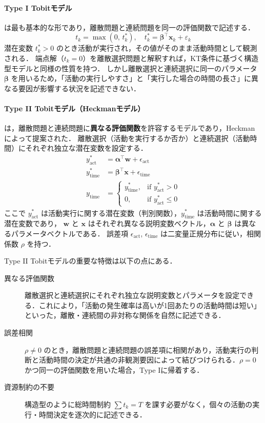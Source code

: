 \paragraph{Type I Tobitモデル}は最も基本的な形であり，離散問題と連続問題を同一の評価関数で記述する．
\begin{equation}\label{eq:tobit_typeI}
  t_k = \max(0, \, t_k^*), \quad t_k^* = \bm{\beta}^\top \bm{x}_k + \varepsilon_k
\end{equation}
潜在変数 $t_k^* > 0$ のとき活動が実行され，その値がそのまま活動時間として観測される．
端点解（$t_k = 0$）を離散選択問題と解釈すれば，KT条件に基づく構造型モデルと同様の性質を持つ．
しかし離散選択と連続選択に同一のパラメータ $\bm{\beta}$ を用いるため，「活動の実行しやすさ」と「実行した場合の時間の長さ」に異なる要因が影響する状況を記述できない．

\paragraph{Type II Tobitモデル（Heckmanモデル）}は，離散問題と連続問題に\textbf{異なる評価関数}を許容するモデルであり，Heckman \cite{Heckman1979} によって提案された．
離散選択（活動を実行するか否か）と連続選択（活動時間）にそれぞれ独立な潜在変数を設定する．
\begin{align}
  y^*_{\mathrm{act}} &= \bm{\alpha}^\top \bm{w} + \epsilon_{\mathrm{act}} \label{eq:tobit2_discrete} \\
  y^*_{\mathrm{time}} &= \bm{\beta}^\top \bm{x} + \epsilon_{\mathrm{time}} \label{eq:tobit2_continuous} \\
  y_{\mathrm{time}} &= \begin{cases} y^*_{\mathrm{time}}, & \text{if } y^*_{\mathrm{act}} > 0 \\ 0, & \text{if } y^*_{\mathrm{act}} \leq 0 \end{cases} \label{eq:tobit2_observe}
\end{align}
ここで $y^*_{\mathrm{act}}$ は活動実行に関する潜在変数（判別関数），$y^*_{\mathrm{time}}$ は活動時間に関する潜在変数であり，
$\bm{w}$ と $\bm{x}$ はそれぞれ異なる説明変数ベクトル，$\bm{\alpha}$ と $\bm{\beta}$ は異なるパラメータベクトルである．
誤差項 $\epsilon_{\mathrm{act}}$, $\epsilon_{\mathrm{time}}$ は二変量正規分布に従い，相関係数 $\rho$ を持つ．

Type II Tobitモデルの重要な特徴は以下の点にある．
\begin{description}
  \item[異なる評価関数]
    離散選択と連続選択にそれぞれ独立な説明変数とパラメータを設定できる．これにより，「活動の発生確率は高いが1回あたりの活動時間は短い」といった，離散・連続間の非対称な関係を自然に記述できる．
  \item[誤差相関]
    $\rho \neq 0$ のとき，離散問題と連続問題の誤差項に相関があり，活動実行の判断と活動時間の決定が共通の非観測要因によって結びつけられる．$\rho = 0$ かつ同一の評価関数を用いた場合，Type Iに帰着する．
  \item[資源制約の不要]
    構造型のように総時間制約 $\sum t_k = T$ を課す必要がなく，個々の活動の実行・時間決定を逐次的に記述できる．
\end{description}

